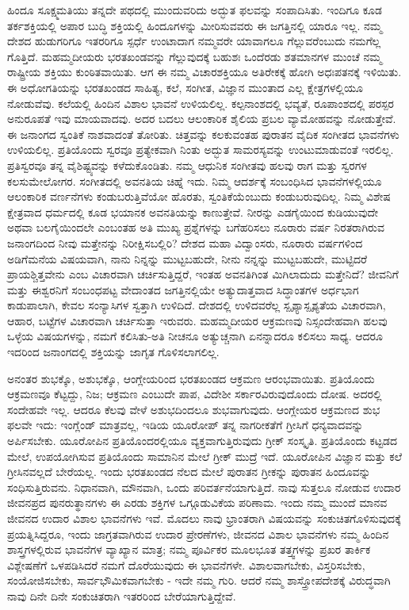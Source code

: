 ಹಿಂದೂ ಸೂಕ್ಷ್ಮಮತಿಯು ತನ್ನದೇ ಪಥದಲ್ಲಿ ಮುಂದುವರಿದು ಅದ್ಭುತ ಫಲವನ್ನು ಸಂಪಾದಿಸಿತು. ಇಂದಿಗೂ ಕೂಡ ತರ್ಕಶಕ್ತಿಯಲ್ಲಿ ಅಪಾರ ಬುದ್ಧಿ ಶಕ್ತಿಯಲ್ಲಿ ಹಿಂದೂಗಳನ್ನು ಮೀರಿಸುವವರು ಈ ಜಗತ್ತಿನಲ್ಲಿ ಯಾರೂ ಇಲ್ಲ. ನಮ್ಮ ದೇಶದ ಹುಡುಗರಿಗೂ ಇತರರಿಗೂ ಸ್ಪರ್ಧೆ ಉಂಟಾದಾಗ ನಮ್ಮವರೇ ಯಾವಾಗಲೂ ಗೆಲ್ಲುವರೆಂಬುದು ನಮಗೆಲ್ಲ ಗೊತ್ತಿದೆ. ಮಹಮ್ಮದೀಯರು ಭರತಖಂಡವನ್ನು ಗೆಲ್ಲುವುದಕ್ಕೆ ಬಹುಶಃ ಒಂದೆರಡು ಶತಮಾನಗಳ ಮುಂಚೆ ನಮ್ಮ ರಾಷ್ಟ್ರೀಯ ಶಕ್ತಿಯು ಕುಂಠಿತವಾಯಿತು. ಆಗ ಈ ನಮ್ಮ ವಿಚಾರಶಕ್ತಿಯೂ ಅತಿರೇಕಕ್ಕೆ ಹೋಗಿ ಅಧಃಪತನಕ್ಕೆ ಇಳಿಯಿತು. ಈ ಅಧೋಗತಿಯನ್ನು ಭರತಖಂಡದ ಸಾಹಿತ್ಯ, ಕಲೆ, ಸಂಗೀತ, ವಿಜ್ಞಾನ ಮುಂತಾದ ಎಲ್ಲ ಕ್ಷೇತ್ರಗಳಲ್ಲಿಯೂ ನೋಡುವೆವು. ಕಲೆಯಲ್ಲಿ ಹಿಂದಿನ ವಿಶಾಲ ಭಾವನೆ ಉಳಿಯಲಿಲ್ಲ. ಕಲ್ಪನಾಂಶದಲ್ಲಿ ಭವ್ಯತೆ, ರೂಪಾಂಶದಲ್ಲಿ ಪರಸ್ಪರ ಅನುರೂಪತೆ ಇವು ಮಾಯವಾದವು. ಅದರ ಬದಲು ಆಲಂಕಾರಿಕ ಶೈಲಿಯ ಪ್ರಬಲ ವ್ಯಾಮೋಹವನ್ನು ನೋಡುತ್ತೇವೆ. ಈ ಜನಾಂಗದ ಸ್ವಂತಿಕೆ ನಾಶವಾದಂತೆ ತೋರಿತು. ಚಿತ್ತವನ್ನು ಕಲಕುವಂತಹ ಪುರಾತನ ವೈದಿಕ ಸಂಗೀತದ ಭಾವನೆಗಳು ಉಳಿಯಲಿಲ್ಲ. ಪ್ರತಿಯೊಂದು ಸ್ವರವೂ ಪ್ರತ್ಯೇಕವಾಗಿ ನಿಂತು ಅದ್ಭುತ ಸಾಮರಸ್ಯವನ್ನು ಉಂಟುಮಾಡುವಂತೆ ಇರಲಿಲ್ಲ. ಪ್ರತಿಸ್ವರವೂ ತನ್ನ ವೈಶಿಷ್ಟ್ಯವನ್ನು ಕಳೆದುಕೊಂಡಿತು. ನಮ್ಮ ಆಧುನಿಕ ಸಂಗೀತವು ಹಲವು ರಾಗ ಮತ್ತು ಸ್ವರಗಳ ಕಲಸುಮೇಲೋಗರ. ಸಂಗೀತದಲ್ಲಿ ಅವನತಿಯ ಚಿಹ್ನೆ ಇದು. ನಿಮ್ಮ ಆದರ್ಶಕ್ಕೆ ಸಂಬಂಧಿಸಿದ ಭಾವನೆಗಳಲ್ಲಿಯೂ ಆಲಂಕಾರಿಕ ವರ್ಣನೆಗಳು ಕಂಡುಬರುತ್ತಿವೆಯೋ ಹೊರತು, ಸ್ವಂತಿಕೆಯೆಂಬುದು ಕಂಡುಬರುವುದಿಲ್ಲ. ನಿಮ್ಮ ವಿಶೇಷ ಕ್ಷೇತ್ರವಾದ ಧರ್ಮದಲ್ಲಿ ಕೂಡ ಭಯಾನಕ ಅವನತಿಯನ್ನು ಕಾಣುತ್ತೇವೆ. ನೀರನ್ನು ಎಡಗೈಯಿಂದ ಕುಡಿಯುವುದೇ ಅಥವಾ ಬಲಗೈಯಿಂದಲೇ ಎಂಬಂತಹ ಅತಿ ಮುಖ್ಯ ಪ್ರಶ್ನೆಗಳನ್ನು ಬಗೆಹರಿಸಲು ನೂರಾರು ವರ್ಷ ನಿರತರಾಗಿರುವ ಜನಾಂಗದಿಂದ ನೀವು ಮತ್ತೇನನ್ನು ನಿರೀಕ್ಷಿಸಬಲ್ಲಿರಿ? ದೇಶದ ಮಹಾ ವಿದ್ವಾಂಸರು, ನೂರಾರು ವರ್ಷಗಳಿಂದ ಅಡಿಗೆಮನೆಯ ವಿಷಯವಾಗಿ, ನಾನು ನಿನ್ನನ್ನು ಮುಟ್ಟಬಹುದೇ, ನೀನು ನನ್ನನ್ನು ಮುಟ್ಟಬಹುದೇ, ಮುಟ್ಟಿದರೆ ಪ್ರಾಯಶ್ಚಿತ್ತವೇನು ಎಂಬ ವಿಚಾರವಾಗಿ ಚರ್ಚಿಸುತ್ತಿದ್ದರೆ, ಇಂತಹ ಅವನತಿಗಿಂತ ಮಿಗಿಲಾದುದು ಮತ್ತೇನಿದೆ? ಜೀವನಿಗೆ ಮತ್ತು ಈಶ್ವರನಿಗೆ ಸಂಬಂಧಪಟ್ಟ ವೇದಾಂತದ ಜಗತ್ತಿನಲ್ಲಿಯೇ ಅತ್ಯುದಾತ್ತವಾದ ಸಿದ್ಧಾಂತಗಳ ಅರ್ಧಭಾಗ ಕಾಡುಪಾಲಾಗಿ, ಕೇವಲ ಸಂನ್ಯಾಸಿಗಳ ಸ್ವತ್ತಾಗಿ ಉಳಿದಿದೆ. ದೇಶದಲ್ಲಿ ಉಳಿದವರೆಲ್ಲ ಸ್ಪೃಶ್ಯಾಸ್ಪೃಶ್ಯತೆಯ ವಿಚಾರವಾಗಿ, ಆಹಾರ, ಬಟ್ಟೆಗಳ ವಿಚಾರವಾಗಿ ಚರ್ಚಿಸುತ್ತಾ ಇರುವರು. ಮಹಮ್ಮದೀಯರ ಆಕ್ರಮಣವು ನಿಸ್ಸಂದೇಹವಾಗಿ ಹಲವು ಒಳ್ಳೆಯ ವಿಷಯಗಳನ್ನು, ನಮಗೆ ಕಲಿಸಿತು-ಅತಿ ನೀಚನೂ ಅತ್ಯುಚ್ಚನಾಗಿ ಏನನ್ನಾದರೂ ಕಲಿಸಲು ಸಾಧ್ಯ. ಆದರೂ ಇದರಿಂದ ಜನಾಂಗದಲ್ಲಿ ಶಕ್ತಿಯನ್ನು ಜಾಗೃತ ಗೊಳಿಸಲಾಗಲಿಲ್ಲ.

ಅನಂತರ ಶುಭಕ್ಕೊ, ಅಶುಭಕ್ಕೊ, ಆಂಗ್ಲೇಯರಿಂದ ಭರತಖಂಡದ ಆಕ್ರಮಣ ಆರಂಭವಾಯಿತು. ಪ್ರತಿಯೊಂದು ಆಕ್ರಮಣವೂ ಕೆಟ್ಟದ್ದು, ನಿಜ; ಆಕ್ರಮಣ ಎಂಬುದೇ ಪಾಪ, ವಿದೇಶೀ ಸರ್ಕಾರವಿರುವುದೊಂದು ದೋಷ. ಅದರಲ್ಲಿ ಸಂದೇಹವೇ ಇಲ್ಲ. ಆದರೂ ಕೆಲವು ವೇಳೆ ಅಶುಭದಿಂದಲೂ ಶುಭವಾಗುವುದು. ಆಂಗ್ಲೇಯರ ಆಕ್ರಮಣದ ಶುಭ ಫಲವೇ ಇದು: ಇಂಗ್ಲೆಂಡ್​ ಮಾತ್ರವಲ್ಲ, ಇಡಿಯ ಯೂರೋಪ್​ ತನ್ನ ನಾಗರೀಕತೆಗೆ ಗ್ರೀಸಿಗೆ ಧನ್ಯವಾದವನ್ನು ಅರ್ಪಿಸಬೇಕು. ಯೂರೋಪಿನ ಪ್ರತಿಯೊಂದರಲ್ಲಿಯೂ ವ್ಯಕ್ತವಾಗುತ್ತಿರುವುದು ಗ್ರೀಕ್​ ಸಂಸ್ಕೃತಿ. ಪ್ರತಿಯೊಂದು ಕಟ್ಟಡದ ಮೇಲೆ, ಉಪಯೋಗಿಸುವ ಪ್ರತಿಯೊಂದು ಸಾಮಾನಿನ ಮೇಲೆ ಗ್ರೀಕ್​ ಮುದ್ರೆ ಇದೆ. ಯೂರೋಪಿನ ವಿಜ್ಞಾನ ಮತ್ತು ಕಲೆ ಗ್ರೀಸಿನವಲ್ಲದೆ ಬೇರೆಯಲ್ಲ. ಇಂದು ಭರತಖಂಡದ ನೆಲದ ಮೇಲೆ ಪುರಾತನ ಗ್ರೀಕನ್ನು ಪುರಾತನ ಹಿಂದೂವನ್ನು ಸಂಧಿಸುತ್ತಿರುವನು. ನಿಧಾನವಾಗಿ, ಮೌನವಾಗಿ, ಒಂದು ಪರಿವರ್ತನೆಯಾಗುತ್ತಿದೆ. ನಾವು ಸುತ್ತಲೂ ನೋಡುವ ಉದಾರ ಜೀವನಪ್ರದ ಪುನರುತ್ಥಾನಗಳು ಈ ಎರಡು ಶಕ್ತಿಗಳ ಒಗ್ಗೂಡುವಿಕೆಯ ಪರಿಣಾಮ. ಇಂದು ನಮ್ಮ ಮುಂದೆ ಮಾನವ ಜೀವನದ ಉದಾರ ವಿಶಾಲ ಭಾವನೆಗಳು ಇವೆ. ಮೊದಲು ನಾವು ಭ್ರಾಂತರಾಗಿ ವಿಷಯವನ್ನು ಸಂಕುಚಿತಗೊಳಿಸುವುದಕ್ಕೆ ಪ್ರಯತ್ನಿಸಿದ್ದರೂ, ಇಂದು ಜಾಗ್ರತವಾಗಿರುವ ಉದಾರ ಪ್ರೇರಣೆಗಳು, ಜೀವನದ ವಿಶಾಲ ಭಾವನೆಗಳು ನಮ್ಮ ಹಿಂದಿನ ಶಾಸ್ತ್ರಗಳಲ್ಲಿರುವ ಭಾವನೆಗಳ ವ್ಯಾಖ್ಯಾನ ಮಾತ್ರ; ನಮ್ಮ ಪೂರ್ವಿಕರ ಮೂಲಭೂತ ತತ್ತ್ವಗಳನ್ನು ಪ್ರಖರ ತಾರ್ಕಿಕ ವಿಶ್ಲೇಷಣೆಗೆ ಒಳಪಡಿಸಿದರೆ ನಮಗೆ ದೊರೆಯುವುದು ಈ ಭಾವನೆಗಳೇ. ವಿಶಾಲವಾಗಬೇಕು, ವಿಸ್ತರಿಸಬೇಕು, ಸಂಯೋಜಿಸಬೇಕು, ಸಾರ್ವಭೌಮಿಕವಾಗಬೇಕು - ಇದೇ ನಮ್ಮ ಗುರಿ. ಆದರೆ ನಮ್ಮ ಶಾಸ್ತ್ರೋಪದೇಶಕ್ಕೆ ವಿರುದ್ಧವಾಗಿ ನಾವು ದಿನೇ ದಿನೇ ಸಂಕುಚಿತರಾಗಿ ಇತರರಿಂದ ಬೇರೆಯಾಗುತ್ತಿದ್ದೇವೆ.

